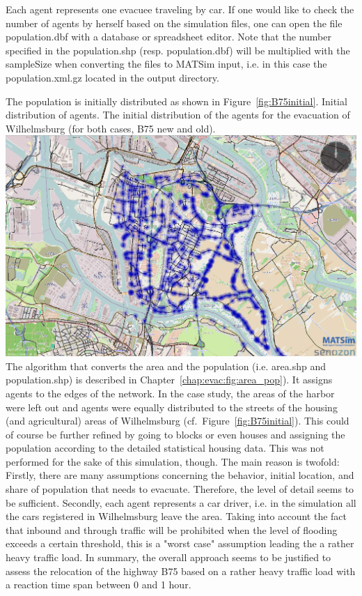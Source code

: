 Each agent represents one evacuee traveling by car. If one would like to check the number of agents by herself based on the simulation files, one can open the file population.dbf with a database or spreadsheet editor. Note that the number specified in the population.shp (resp. population.dbf) will be multiplied with the sampleSize when converting the files to MATSim input, i.e. in this case the population.xml.gz located in the output directory.

The population is initially distributed as shown in Figure~\ref{fig:B75initial}. 
%
\createfigure%
{Initial distribution of agents.}%
{The initial distribution of the agents for the evacuation of Wilhelmsburg (for both cases, B75 new and old).}%
{\label{fig:B75initial}}%
{\includegraphics[width=0.7\linewidth]{using/figures/B75initial}}%
{}
The algorithm that converts the area and the population (i.e. area.shp and population.shp) is described in Chapter~\ref{chap:evac:fig:area_pop}). It assigns agents to the edges of the network. In the case study, the areas of the harbor were left out and agents were equally distributed to the streets of the housing (and agricultural) areas of Wilhelmsburg (cf.\ Figure~\ref{fig:B75initial}).
This could of course be further refined by going to blocks or even houses and assigning the population according to the detailed statistical housing data. This was not performed for the sake of this simulation, though. The main reason is twofold: Firstly, there are many assumptions concerning the behavior, initial location, and share of population that needs to evacuate. Therefore, the level of detail seems to be sufficient. Secondly, each agent represents a car driver, i.e. in the simulation all the cars registered in Wilhelmsburg leave the area. Taking into account the fact that inbound and through traffic will be prohibited when the level of flooding exceeds a certain threshold, this is a "worst case" assumption leading the a rather heavy traffic load. In summary, the overall approach seems to be justified to assess the relocation of the highway B75 based on a rather heavy traffic load with a reaction time span between 0 and 1 hour.


